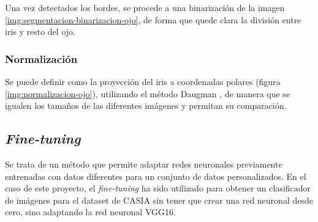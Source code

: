 

Una vez detectados los bordes, se procede a una binarización de la imagen \ref{img:segmentacion-binarizacion-ojo}, de forma que quede clara la división entre iris y resto del ojo.



\subsubsection{Normalización}\label{subsubsec:normalizacion}

Se puede definir como la proyección del iris a coordenadas polares (figura \ref{img:normalizacion-ojo}), utilizando el método Daugman \cite{daugman_normalization_1993}, de manera que se igualen los tamaños de las diferentes imágenes y permitan su comparación.



\subsection{\textit{Fine-tuning}}\label{subsec:fine-tuning}
 Se trata de un método que permite adaptar redes neuronales previamente entrenadas con datos diferentes para un conjunto de datos personalizados. En el caso de este proyecto,
 el \textit{fine-tuning} ha sido utilizado para obtener un clasificador de imágenes para el dataset de CASIA sin tener que crear una red neuronal desde cero, sino adaptando la red
  neuronal VGG16.

